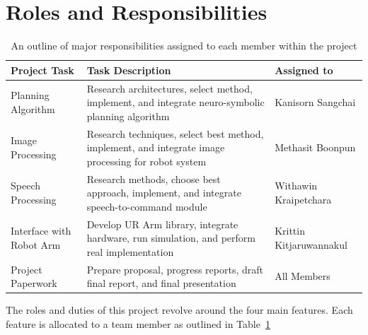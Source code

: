 \documentclass[12pt]{extarticle}
\begin{document}
\newpage
\section{Roles and Responsibilities}

{
\renewcommand{\arraystretch}{1.3} %
\begin{table}[h!]
    \centering
    \begin{tabular}{|l|p{6cm}|l|}
        \hline
        \textbf{Project Task} & \textbf{Task Description} & \textbf{Assigned to} \\
        \hline
        Planning Algorithm & Research architectures, select method, implement, and integrate neuro-symbolic planning algorithm & Kanisorn Sangchai \\
        \hline
        Image Processing & Research techniques, select best method, implement, and integrate image processing for robot system & Methasit Boonpun \\
        \hline
        Speech Processing & Research methods, choose best approach, implement, and integrate speech-to-command module & Withawin Kraipetchara \\
        \hline
        Interface with Robot Arm & Develop UR Arm library, integrate hardware, run simulation, and perform real implementation & Krittin Kitjaruwannakul \\
        \hline
        Project Paperwork & Prepare proposal, progress reports, draft final report, and final presentation & All Members \\
        \hline
    \end{tabular}
    \caption{An outline of major responsibilities assigned to each member within the project}
    \label{tab:roles_responsibilities}
\end{table}
}

The roles and duties of this project revolve around the four main features. Each feature is allocated to a team member as outlined in Table~\ref{tab:roles_responsibilities}


\newpage


\end{document}
